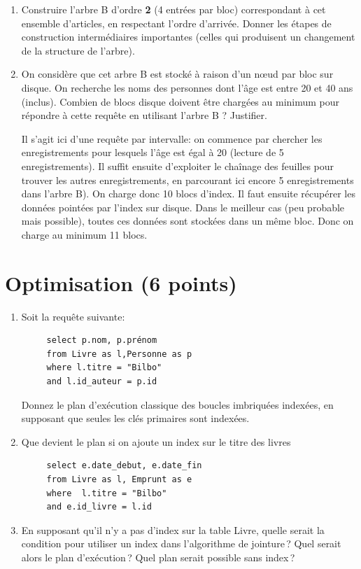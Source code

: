 \begin{enumerate}

\item Construire l'arbre B d'ordre \textbf{2} (4 entrées par bloc)
correspondant à cet ensemble d'articles, en respectant l'ordre d'arrivée. 
Donner les étapes de construction intermédiaires importantes (celles qui produisent 
un changement de la structure de l'arbre).


\item On considère que cet arbre B  est stocké à raison d'un n{\oe}ud par bloc sur disque. On recherche les noms des personnes dont l'âge est entre 20 et 40 ans (inclus). 
Combien de blocs disque doivent être chargées au minimum pour répondre à cette requête en utilisant l'arbre B ? Justifier. 


\begin{solution}
Il s'agit ici d'une requête par intervalle: on commence par chercher les enregistrements pour lesquels l'âge est égal à 20 (lecture de 5 enregistrements). Il suffit ensuite d'exploiter le chaînage des feuilles pour trouver les autres enregistrements, en parcourant ici encore 5 enregistrements dans l'arbre B). On charge donc 10 
blocs d'index. Il faut ensuite récupérer les données pointées par l'index sur disque. Dans le meilleur cas (peu probable mais possible), toutes ces données sont stockées dans un même 
bloc. Donc on charge au minimum 11 blocs. 
\end{solution}

\end{enumerate}


\section{Optimisation (6 points)}

\begin{enumerate}

   \item Soit la requête suivante:
\begin{verbatim}
     select p.nom, p.prénom
     from Livre as l,Personne as p
     where l.titre = "Bilbo"
     and l.id_auteur = p.id
\end{verbatim}

  Donnez le plan d'exécution classique des boucles imbriquées indexées, en supposant
     que seules les clés primaires sont indexées.
     
    \item Que devient le plan si on ajoute un index sur le titre des livres 
     
\begin{verbatim}
     select e.date_debut, e.date_fin 
     from Livre as l, Emprunt as e
     where  l.titre = "Bilbo"
     and e.id_livre = l.id
\end{verbatim}

  
  \item En supposant qu'il n'y a pas d'index sur la table Livre, quelle serait la condition
   pour utiliser un index
   dans l'algorithme de jointure\,? Quel
   serait alors le plan d'exécution\,?  Quel plan serait possible sans index\,?

\end{enumerate}

